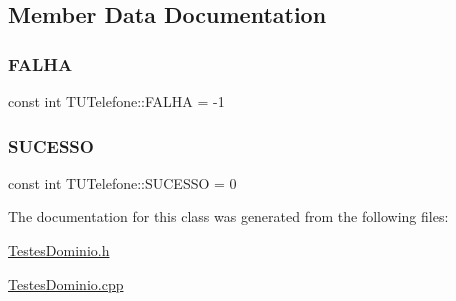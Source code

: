 \subsection{Member Data Documentation}
\mbox{\label{class_t_u_telefone_a6bfda7ef5af9266bd5ca1b246002f3c7}} 
\subsubsection{\texorpdfstring{F\+A\+L\+HA}{FALHA}}
{\footnotesize\ttfamily const int T\+U\+Telefone\+::\+F\+A\+L\+HA = -\/1\hspace{0.3cm}{\ttfamily [static]}}

\mbox{\label{class_t_u_telefone_a26c0d033f5372652434fdcb5b054c16e}} 
\subsubsection{\texorpdfstring{S\+U\+C\+E\+S\+SO}{SUCESSO}}
{\footnotesize\ttfamily const int T\+U\+Telefone\+::\+S\+U\+C\+E\+S\+SO = 0\hspace{0.3cm}{\ttfamily [static]}}



The documentation for this class was generated from the following files\+:\begin{DoxyCompactItemize}
\item 
\hyperlink{_testes_dominio_8h}{Testes\+Dominio.\+h}\item 
\hyperlink{_testes_dominio_8cpp}{Testes\+Dominio.\+cpp}\end{DoxyCompactItemize}
